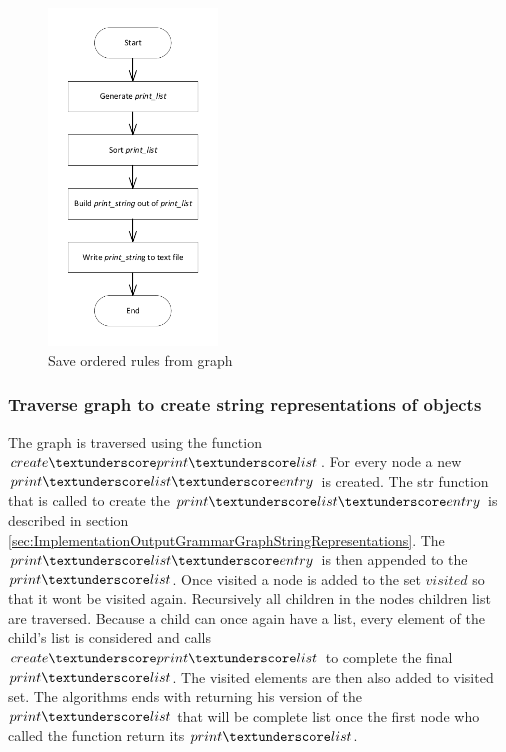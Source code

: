 \begin{figure}[H]
\centering
\includegraphics[width=0.4\textwidth]{images/Implementation_saveorderedrules.pdf}
\caption{Save ordered rules from graph}
\label{fig:ImplementationOutputSaveOrderedRules}
\end{figure}

\subsubsection{Traverse graph to create string representations of objects}\label{sec:ImpolementationOutputGrammarGraphTraverse}

The graph is traversed using the function $create\textunderscore print\textunderscore list$. For every node a new $print\textunderscore list\textunderscore entry$ is created. The str function that is called to create the $print\textunderscore list\textunderscore entry$ is described in section \ref{sec:ImplementationOutputGrammarGraphStringRepresentations}. 
The $print\textunderscore list\textunderscore entry$ is then appended to the $print\textunderscore list$. Once visited a node is added to the set $visited$ so that it wont be visited again.
Recursively all children in the nodes children list are traversed. Because a child can once again have a list, every element of the child's list is considered and calls $create\textunderscore print\textunderscore list$ to complete the final $print\textunderscore list$. The visited elements are then also added to visited set. The algorithms ends with returning his version of the $print\textunderscore list$ that will be complete list once the first node who called the function return its $print\textunderscore list$.

